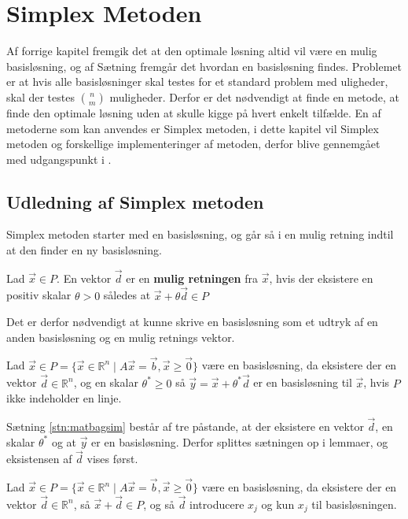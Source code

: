 \chapter{Simplex Metoden}
Af forrige kapitel fremgik det at den optimale løsning altid vil være en mulig basisløsning, og af Sætning 
fremgår det hvordan en basisløsning findes. 
Problemet er at hvis alle basisløsninger skal testes for et standard problem med uligheder, skal der testes $\binom{n}{m}$ muligheder. 
Derfor er det nødvendigt at finde en metode, at finde den optimale løsning uden at skulle kigge på hvert enkelt tilfælde. 
En af metoderne som kan anvendes er Simplex metoden, i dette kapitel vil Simplex metoden og forskellige implementeringer af metoden, derfor blive gennemgået med udgangspunkt i .
\section{Udledning af Simplex metoden}
Simplex metoden starter med en basisløsning, og går så i en mulig retning indtil at den finder en ny basisløsning.
\begin{defn}
Lad $\vec{x} \in P$. En vektor $\vec{d}$ er en \textbf{mulig retningen} fra $\vec{x}$, hvis der eksistere en positiv skalar $\theta > 0$ således at $\vec{x}+\theta\vec{d} \in P$ 
\end{defn}
Det er derfor nødvendigt at kunne skrive en basisløsning som et udtryk af en anden basisløsning og en mulig retnings vektor.
\begin{stn}
Lad $\vec{x} \in P =\{\vec{x}\in \mathds{R}^n \mid A\vec{x}= \vec{b}, \vec{x}\geq \vec{0}\}$ være en basisløsning, da eksistere der en vektor $\vec{d}\in \mathds{R}^n$, og en skalar $\theta^*\geq 0$ så $\vec{y}= \vec{x} + \theta^* \vec{d}$ er en basisløsning til $\vec{x}$, hvis $P$ ikke indeholder en linje.
\label{stn:matbagsim}
\end{stn}
Sætning \ref{stn:matbagsim} består af tre påstande, at der eksistere en vektor $\vec{d}$, en skalar $\theta^*$ og at $\vec{y}$ er en basisløsning.
Derfor splittes sætningen op i lemmaer, og eksistensen af $\vec{d}$ vises først.
\begin{lma}
Lad $\vec{x} \in P =\{\vec{x}\in \mathds{R}^n \mid A\vec{x}= \vec{b}, \vec{x}\geq \vec{0}\}$ være en basisløsning, da eksistere der en vektor $\vec{d}\in \mathds{R}^n$, så $\vec{x} + \vec{d} \in P$, og så $\vec{d}$ introducere $x_j$ og kun $x_j$ til basisløsningen.
\label{lma:retningsvektor}
\end{lma}
